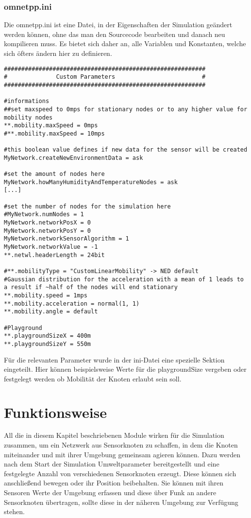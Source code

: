 \subsubsection{omnetpp.ini}

Die omnetpp.ini ist eine Datei, in der Eigenschaften der Simulation geändert werden können, ohne das man den Sourcecode bearbeiten und danach neu kompilieren muss. Es bietet sich daher an, alle Variablen und Konstanten, welche sich öfters ändern hier zu definieren.\newline

\begin{lstlisting}
##########################################################
#    		   Custom Parameters	                     #
##########################################################

#informations
##set maxspeed to 0mps for stationary nodes or to any higher value for mobility nodes
**.mobility.maxSpeed = 0mps
#**.mobility.maxSpeed = 10mps

#this boolean value defines if new data for the sensor will be created
MyNetwork.createNewEnvironmentData = ask

#set the amount of nodes here
MyNetwork.howManyHumidityAndTemperatureNodes = ask
[...]

#set the number of nodes for the simulation here
#MyNetwork.numNodes = 1
MyNetwork.networkPosX = 0
MyNetwork.networkPosY = 0
MyNetwork.networkSensorAlgorithm = 1
MyNetwork.networkValue = -1
**.netwl.headerLength = 24bit

#**.mobilityType = "CustomLinearMobility" -> NED default
#Gaussian distribution for the acceleration with a mean of 1 leads to a result if ~half of the nodes will end stationary
**.mobility.speed = 1mps
**.mobility.acceleration = normal(1, 1)
**.mobility.angle = default

#Playground
**.playgroundSizeX = 400m
**.playgroundSizeY = 550m
\end{lstlisting}

Für die relevanten Parameter wurde in der ini-Datei eine spezielle Sektion eingeteilt. Hier können beispielsweise Werte für die playgroundSize vergeben oder festgelegt werden ob Mobilität der Knoten erlaubt sein soll.

\section{Funktionsweise}

All die in diesem Kapitel beschriebenen Module wirken für die Simulation zusammen, um ein Netzwerk aus Sensorknoten zu schaffen, in dem die Knoten miteinander und mit ihrer Umgebung gemeinsam agieren können. Dazu werden nach dem Start der Simulation Umweltparameter bereitgestellt und eine festgelegte Anzahl von verschiedenen Sensorknoten erzeugt. Diese können sich anschließend bewegen oder ihr Position beibehalten. Sie können mit ihren Sensoren Werte der Umgebung erfassen und diese über Funk an andere Sensorknoten übertragen, sollte diese in der näheren Umgebung zur Verfügung stehen.
